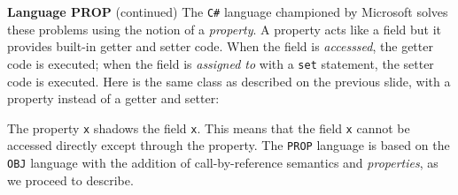 \begin{minipage}[t]{\sw}
\slidenumber
\LARGE
{\bf Language PROP} (continued)\exx
The \verb'C#' language championed by Microsoft
solves these problems using the notion of a {\em property}.
A property acts like a field
but it provides built-in getter and setter code.
When the field is {\em accesssed}, the getter code is executed;
when the field is {\em assigned to} with a \verb'set' statement,
the setter code is executed.\exx
Here is the same class as described on the previous slide,
with a property instead of a getter and setter:
\Large
{} %
\LARGE
The property \verb'x' shadows the field \verb'x'.
This means that the field \verb'x' cannot be accessed directly
except through the property.\exx
The \verb'PROP' language is based on the \verb'OBJ' language
with the addition of call-by-reference semantics
and {\em properties}, as we proceed to describe.
\end{minipage}
